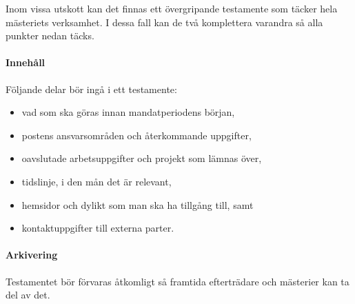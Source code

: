\documentclass{dsekguideline}
\begin{document}
Inom vissa utskott kan det finnas ett övergripande testamente som täcker hela
mästeriets verksamhet. I dessa fall kan de två komplettera varandra så alla
punkter nedan täcks.

\paragraph{Innehåll}
Följande delar bör ingå i ett testamente:
\begin{itemize}
\item vad som ska göras innan mandatperiodens början,
\item postens ansvarsområden och återkommande uppgifter,
\item oavslutade arbetsuppgifter och projekt som lämnas över,
\item tidslinje, i den mån det är relevant,
\item hemsidor och dylikt som man ska ha tillgång till, samt
\item kontaktuppgifter till externa parter.
\end{itemize}

\paragraph{Arkivering}
Testamentet bör förvaras åtkomligt så framtida efterträdare och mästerier kan ta
del av det.
\end{document}

